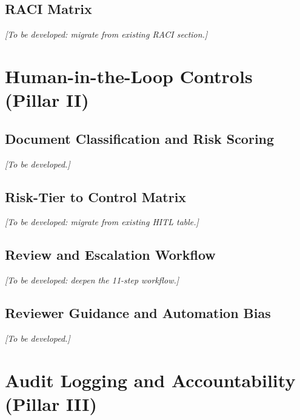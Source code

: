 \documentclass[12pt,a4paper]{article}
\begin{document}
\subsection{RACI Matrix}
\textit{[To be developed: migrate from existing RACI section.]}

\section{Human-in-the-Loop Controls (Pillar II)}

\subsection{Document Classification and Risk Scoring}
\textit{[To be developed.]}

\subsection{Risk-Tier to Control Matrix}
\textit{[To be developed: migrate from existing HITL table.]}

\subsection{Review and Escalation Workflow}
\textit{[To be developed: deepen the 11-step workflow.]}

\subsection{Reviewer Guidance and Automation Bias}
\textit{[To be developed.]}

\section{Audit Logging and Accountability (Pillar III)}
\end{document}
